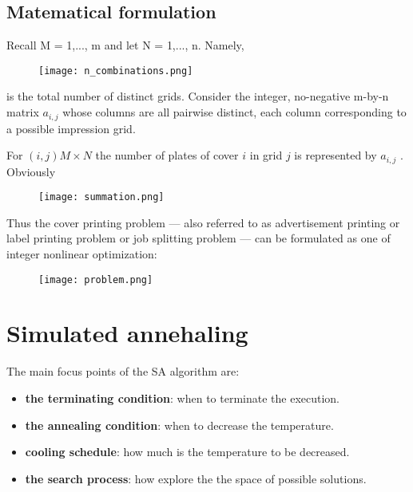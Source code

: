 ﻿\documentclass[a4paper]{article}
\begin{document}
\subsection{Matematical formulation}
Recall M = {1,..., m} and let N  = {1,..., n}. Namely,

\begin{figure}[H]
\begin{center}
    \texttt{[image: n\_combinations.png]}
\end{center}
\end{figure}

is the total number of distinct grids. Consider the integer, no-negative m-by-n matrix {$a_{i,j}$} whose columns are all pairwise distinct, each column corresponding to a possible impression grid.

For $(i, j)  M × N$ the number of plates of cover $i$ in grid $j$ is represented by $a_{i,j}$ . Obviously
\begin{figure}[h!]
\begin{center}
    \texttt{[image: summation.png]}
\end{center}
\end{figure}

Thus the cover printing problem — also referred to as advertisement printing or label printing problem or job splitting problem — can be formulated as one of integer nonlinear optimization:

\begin{figure}[h!]
\begin{center}
    \texttt{[image: problem.png]}
\end{center}
\end{figure}

\section{Simulated annehaling}
The main focus points of the SA algorithm are:
\begin{itemize}
\item \textbf{the terminating condition}: when to terminate the execution.
\item \textbf{the annealing condition}: when to decrease the temperature.
\item \textbf{cooling schedule}: how much is the temperature to be decreased.
\item \textbf{the search process}: how explore the the space of possible solutions.
\end{itemize}
\end{document}

